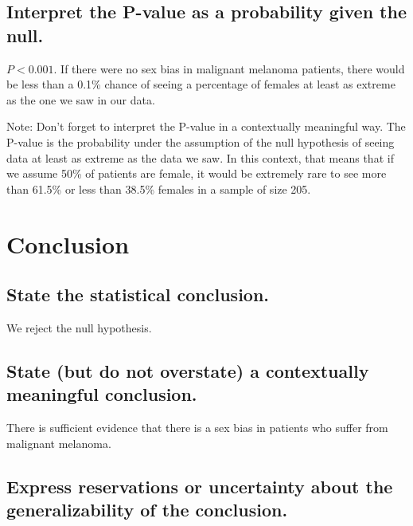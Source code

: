 \documentclass[
]{book}
\begin{document}
\hypertarget{hypothesis2-ex-interpret-p}{%
\subsection{Interpret the P-value as a probability given the null.}\label{hypothesis2-ex-interpret-p}}

\(P < 0.001\). If there were no sex bias in malignant melanoma patients, there would be less than a 0.1\% chance of seeing a percentage of females at least as extreme as the one we saw in our data.

Note: Don't forget to interpret the P-value in a contextually meaningful way. The P-value is the probability under the assumption of the null hypothesis of seeing data at least as extreme as the data we saw. In this context, that means that if we assume 50\% of patients are female, it would be extremely rare to see more than 61.5\% or less than 38.5\% females in a sample of size 205.

\hypertarget{hypothesis2-ex-ht-conclusion}{%
\section{Conclusion}\label{hypothesis2-ex-ht-conclusion}}

\hypertarget{hypothesis2-ex-stat-conclusion}{%
\subsection{State the statistical conclusion.}\label{hypothesis2-ex-stat-conclusion}}

We reject the null hypothesis.

\hypertarget{hypothesis2-ex-context-conclusion}{%
\subsection{State (but do not overstate) a contextually meaningful conclusion.}\label{hypothesis2-ex-context-conclusion}}

There is sufficient evidence that there is a sex bias in patients who suffer from malignant melanoma.

\hypertarget{hypothesis2-ex-reservations}{%
\subsection{Express reservations or uncertainty about the generalizability of the conclusion.}\label{hypothesis2-ex-reservations}}
\end{document}
